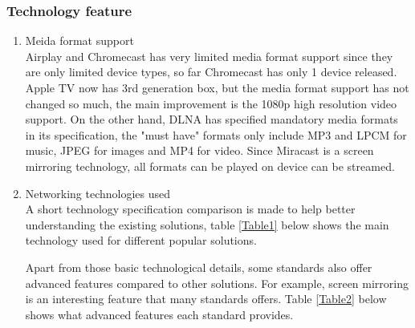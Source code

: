 \subsubsection{Technology feature}
\begin{enumerate}
\item Meida format support \\
Airplay and Chromecast has very limited media format support since they are only limited device 
types, so far Chromecast has only 1 device released. Apple TV now has 3rd generation box, but the 
media format support has not changed so much, the main improvement is the 1080p high resolution 
video support. On the other hand, DLNA has specified mandatory media formats in its specification, 
the "must have" formats only include MP3 and LPCM for music, JPEG for images and MP4 for video. 
Since Miracast is a screen mirroring technology, all formats can be played on device can be streamed.

\item Networking technologies used \\

A short technology specification comparison is made to help better understanding
the existing solutions, table \ref{Table1} below shows the main technology used
for different popular solutions.
\begin{table}[htb]
\caption{Technology used \label{Table1}}
\begin{center}
\end{center}
\end{table}

Apart from those basic technological details, some standards also offer advanced
features compared to other solutions. For example, screen mirroring is an
interesting feature that many standards offers. Table \ref{Table2} below shows
what advanced features each standard provides.
\begin{table}[htb]
\caption{Advanced feature comparison \label{Table2}}
\begin{center}
\end{center}
\end{table}



\end{enumerate}
